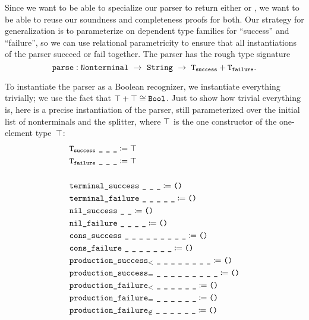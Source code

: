   Since we want to be able to specialize our parser to return either \Bool\space or , we want to be able to reuse our soundness and completeness proofs for both.  Our strategy for generalization is to parameterize on dependent type families for ``success'' and ``failure'', so we can use relational parametricity to ensure that all instantiations of the parser succeed or fail together.  The parser has the rough type signature
  $$\oftype{\fname{parse}}{\Nonterminal~\typeto~\String~\typeto~\typesum{\fname{T$_{\fname{success}}$}}{\fname{T$_{\fname{failure}}$}}}.$$

  To instantiate the parser as a Boolean recognizer, we instantiate everything trivially; we use the fact that $\typesum{\Unit}{\Unit}\cong\Bool$.  Just to show how trivial everything is, here is a precise instantiation of the parser, still parameterized over the initial list of nonterminals and the splitter, where $\top$ is the one constructor of the one-element type~$\top$:
  {\allowdisplaybreaks
  \begin{align*}
    & \texttt{T$_{\texttt{success}}$}~\texttt{\_}~\texttt{\_}~\texttt{\_} \coloneqq \top \\
    & \texttt{T$_{\texttt{failure}}$}~\texttt{\_}~\texttt{\_}~\texttt{\_} \coloneqq \top \\
    \\
    & \texttt{terminal\_success}~\texttt{\_}~\texttt{\_}~\texttt{\_} \coloneqq \texttt{()} \\
    & \texttt{terminal\_failure}~\texttt{\_}~\texttt{\_}~\texttt{\_}~\texttt{\_}~\texttt{\_} \coloneqq \texttt{()} \\
    & \texttt{nil\_success}~\texttt{\_}~\texttt{\_} \coloneqq \texttt{()} \\
    & \texttt{nil\_failure}~\texttt{\_}~\texttt{\_}~\texttt{\_}~\texttt{\_} \coloneqq \texttt{()} \\
    & \texttt{cons\_success}~\texttt{\_}~\texttt{\_}~\texttt{\_}~\texttt{\_}~\texttt{\_}~\texttt{\_}~\texttt{\_}~\texttt{\_}~\texttt{\_} \coloneqq \texttt{()} \\
    & \texttt{cons\_failure}~\texttt{\_}~\texttt{\_}~\texttt{\_}~\texttt{\_}~\texttt{\_}~\texttt{\_}~\texttt{\_} \coloneqq \texttt{()} \\
    & \texttt{production\_success$_<$}~\texttt{\_}~\texttt{\_}~\texttt{\_}~\texttt{\_}~\texttt{\_}~\texttt{\_}~\texttt{\_}~\texttt{\_} \coloneqq \texttt{()} \\
    & \texttt{production\_success$_=$}~\texttt{\_}~\texttt{\_}~\texttt{\_}~\texttt{\_}~\texttt{\_}~\texttt{\_}~\texttt{\_}~\texttt{\_}~\texttt{\_} \coloneqq \texttt{()} \\
    & \texttt{production\_failure$_<$}~\texttt{\_}~\texttt{\_}~\texttt{\_}~\texttt{\_}~\texttt{\_}~\texttt{\_} \coloneqq \texttt{()} \\
    & \texttt{production\_failure$_=$}~\texttt{\_}~\texttt{\_}~\texttt{\_}~\texttt{\_}~\texttt{\_}~\texttt{\_} \coloneqq \texttt{()} \\
    & \texttt{production\_failure$_{\not\in}$}~\texttt{\_}~\texttt{\_}~\texttt{\_}~\texttt{\_}~\texttt{\_}~\texttt{\_} \coloneqq \texttt{()}
  \end{align*}}

